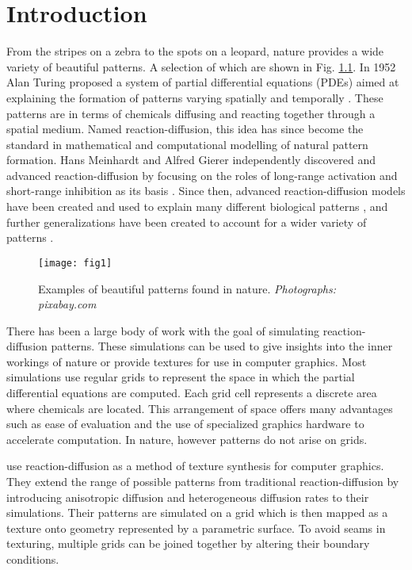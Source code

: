 \chapter{Introduction}
From the stripes on a zebra to the spots on a leopard, nature provides a wide variety of beautiful patterns. A selection of which are shown in Fig. \ref{fig:naturalPatterns1}. In 1952 Alan Turing proposed a system of partial differential equations (PDEs) aimed at explaining the formation of patterns varying spatially and temporally \citep{Turing1952}. These patterns are in terms of chemicals diffusing and reacting together through a spatial medium. Named reaction-diffusion, this idea has since become the standard in mathematical and computational modelling of natural pattern formation. Hans Meinhardt and Alfred Gierer independently discovered and advanced reaction-diffusion by focusing on the roles of long-range activation and short-range inhibition as its basis \citep{gierer1972}. Since then, advanced reaction-diffusion models have been created and used to explain many different biological patterns \citep{GarzonAlvarado2011, fowler1992modeling, lefevre2010reaction}, and further generalizations have been created to account for a wider variety of patterns \citep{KONDO2017120}.

\begin{figure}[H]
  \centering
  \texttt{[image: fig1]}
  \caption{Examples of beautiful patterns found in nature. \textit{Photographs: pixabay.com}}
  \label{fig:naturalPatterns1}
\end{figure}

There has been a large body of work with the goal of simulating reaction-diffusion patterns. These simulations can be used to give insights into the inner workings of nature or provide textures for use in computer graphics. Most simulations use regular grids to represent the space in which the partial differential equations are computed. Each grid cell represents a discrete area where chemicals are located. This arrangement of space offers many advantages such as ease of evaluation and the use of specialized graphics hardware to accelerate computation. In nature, however patterns do not arise on grids. 

\citet{Witkin1991} use reaction-diffusion as a method of texture synthesis for computer graphics. They extend the range of possible patterns from traditional reaction-diffusion by introducing anisotropic diffusion and heterogeneous diffusion rates to their simulations. Their patterns are simulated on a grid which is then mapped as a texture onto geometry represented by a parametric surface.  To avoid seams in texturing, multiple grids can be joined together by altering their boundary conditions. 

